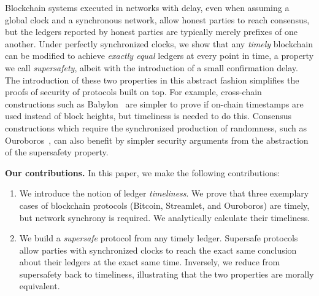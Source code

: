 Blockchain systems executed in networks with delay, even when assuming a global clock and
a synchronous network, allow honest parties to reach consensus, but the ledgers reported by
honest parties are typically merely prefixes of one another.
Under perfectly synchronized clocks, we show that any \emph{timely} blockchain can be modified to achieve
\emph{exactly equal} ledgers at every point in time, a property we call \emph{supersafety},
albeit with the introduction of a small confirmation delay. The introduction of these two
properties in this abstract fashion simplifies the proofs of security of protocols built on
top. For example, cross-chain constructions such as Babylon~\cite{babylon} are simpler
to prove if on-chain timestamps are used instead of block heights,
but timeliness is needed to do this.
Consensus constructions which require the synchronized production of randomness,
such as Ouroboros~\cite{ouroboros,praos}, can also benefit by simpler security
arguments from the abstraction of the supersafety property.

\noindent
\textbf{Our contributions.} In this paper, we make the following contributions:

\begin{enumerate}
  \item We introduce the notion of ledger \emph{timeliness}.
        We prove that three exemplary cases of blockchain protocols (Bitcoin, Streamlet, and Ouroboros)
        are timely, but network synchrony is required. We analytically calculate their timeliness.
  \item We build a \emph{supersafe} protocol from any timely ledger.
        Supersafe protocols allow parties with synchronized clocks to
        reach the exact same conclusion about their ledgers at the exact same time.
        Inversely, we reduce from supersafety back to timeliness, illustrating that
        the two properties are morally equivalent.
\end{enumerate}

